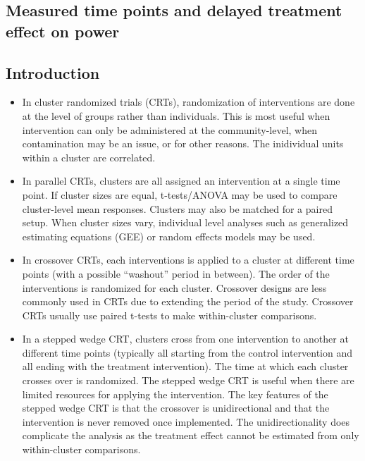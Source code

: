 \documentclass[10pt]{article}
\begin{document}
\subsection{Measured time points and delayed treatment effect on power} \label{apx:power}




\iffalse
\subsection{Introduction}

\begin{itemize}

\item
In cluster randomized trials (CRTs), randomization of interventions are done at the level of groups rather than individuals. This is most useful when intervention can only be administered at the community-level, when contamination may be an issue, or for other reasons. The inidividual units within a cluster are correlated.

\item
In parallel CRTs, clusters are all assigned an intervention at a single time point. If cluster sizes are equal, t-tests/ANOVA may be used to compare cluster-level mean responses. Clusters may also be matched for a paired setup. When cluster sizes vary, individual level analyses such as generalized estimating equations (GEE) or random effects models may be used.

\item
In crossover CRTs, each interventions is applied to a cluster at different time points (with a possible ``washout'' period in between). The order of the interventions is randomized for each cluster. Crossover designs are less commonly used in CRTs due to extending the period of the study. Crossover CRTs usually use paired t-tests to make within-cluster comparisons.

\item
In a stepped wedge CRT, clusters cross from one intervention to another at different time points (typically all starting from the control intervention and all ending with the treatment intervention). The time at which each cluster crosses over is randomized. The stepped wedge CRT is useful when there are limited resources for applying the intervention. The key features of the stepped wedge CRT is that the crossover is unidirectional and that the intervention is never removed once implemented. The unidirectionality does complicate the analysis as the treatment effect cannot be estimated from only within-cluster comparisons.

\end{itemize}
\end{document}

